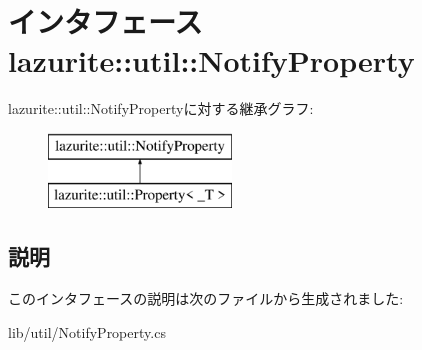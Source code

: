 \hypertarget{interfacelazurite_1_1util_1_1_notify_property}{
\section{インタフェース lazurite::util::NotifyProperty}
\label{interfacelazurite_1_1util_1_1_notify_property}
}
lazurite::util::NotifyPropertyに対する継承グラフ:\begin{figure}[H]
\begin{center}
\leavevmode
\includegraphics[height=2cm]{interfacelazurite_1_1util_1_1_notify_property}
\end{center}
\end{figure}


\subsection{説明}


このインタフェースの説明は次のファイルから生成されました:\begin{DoxyCompactItemize}
\item 
lib/util/NotifyProperty.cs\end{DoxyCompactItemize}

